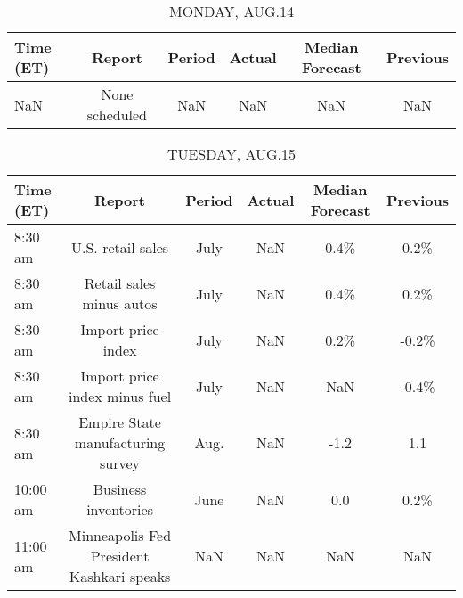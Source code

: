\documentclass{article}%
\begin{document}
%
\normalsize%


\begin{table}[htbp]%
\caption{MONDAY, AUG.14}%
\centering%
\begin{adjustbox}{width=1\textwidth}%
\begin{tabular}{lccccc}
\toprule
Time (ET) &         Report & Period & Actual & Median Forecast & Previous \\
\midrule
      NaN & None scheduled &    NaN &    NaN &             NaN &      NaN \\
\bottomrule
\end{tabular}
%
\end{adjustbox}%
\end{table}

%


\begin{table}[htbp]%
\caption{TUESDAY, AUG.15}%
\centering%
\begin{adjustbox}{width=1\textwidth}%
\begin{tabular}{lccccc}
\toprule
Time (ET) &                                    Report & Period & Actual & Median Forecast & Previous \\
\midrule
  8:30 am &                         U.S. retail sales &   July &    NaN &            0.4\% &     0.2\% \\
  8:30 am &                  Retail sales minus autos &   July &    NaN &            0.4\% &     0.2\% \\
  8:30 am &                        Import price index &   July &    NaN &            0.2\% &    -0.2\% \\
  8:30 am &             Import price index minus fuel &   July &    NaN &             NaN &    -0.4\% \\
  8:30 am &         Empire State manufacturing survey &   Aug. &    NaN &            -1.2 &      1.1 \\
 10:00 am &                      Business inventories &   June &    NaN &             0.0 &     0.2\% \\
 11:00 am & Minneapolis Fed President Kashkari speaks &    NaN &    NaN &             NaN &      NaN \\
\bottomrule
\end{tabular}
%
\end{adjustbox}%
\end{table}

%
\end{document}
